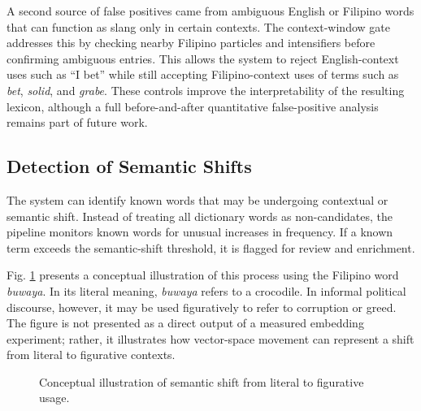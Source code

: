 A second source of false positives came from ambiguous English or Filipino words that can function as slang only in certain contexts. The context-window gate addresses this by checking nearby Filipino particles and intensifiers before confirming ambiguous entries. This allows the system to reject English-context uses such as ``I bet'' while still accepting Filipino-context uses of terms such as \textit{bet}, \textit{solid}, and \textit{grabe}. These controls improve the interpretability of the resulting lexicon, although a full before-and-after quantitative false-positive analysis remains part of future work.

\subsection{Detection of Semantic Shifts}
The system can identify known words that may be undergoing contextual or semantic shift. Instead of treating all dictionary words as non-candidates, the pipeline monitors known words for unusual increases in frequency. If a known term exceeds the semantic-shift threshold, it is flagged for review and enrichment.

Fig. \ref{fig:semantic-shift} presents a conceptual illustration of this process using the Filipino word \textit{buwaya}. In its literal meaning, \textit{buwaya} refers to a crocodile. In informal political discourse, however, it may be used figuratively to refer to corruption or greed. The figure is not presented as a direct output of a measured embedding experiment; rather, it illustrates how vector-space movement can represent a shift from literal to figurative contexts.

\begin{figure}[!t]
\centering
{}
\caption{Conceptual illustration of semantic shift from literal to figurative usage.}
\label{fig:semantic-shift}
\end{figure}

